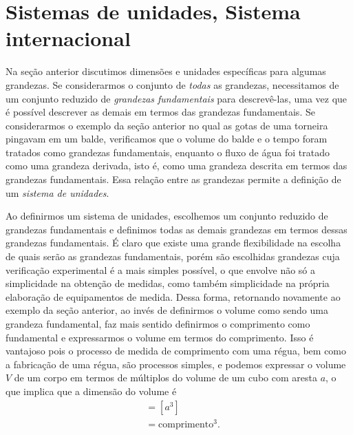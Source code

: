 \section{Sistemas de unidades, Sistema internacional}

Na seção anterior discutimos dimensões e unidades específicas para algumas grandezas. Se considerarmos o conjunto de \emph{todas} as grandezas, necessitamos de um conjunto reduzido de \emph{grandezas fundamentais} para descrevê-las, uma vez que é possível descrever as demais em termos das grandezas fundamentais. Se considerarmos o exemplo da seção anterior no qual as gotas de uma torneira pingavam em um balde, verificamos que o volume do balde e o tempo foram tratados como grandezas fundamentais, enquanto o fluxo de água foi tratado como uma grandeza derivada, isto é, como uma grandeza descrita em termos das grandezas fundamentais. Essa relação entre as grandezas permite a definição de um \emph{sistema de unidades}.

Ao definirmos um sistema de unidades, escolhemos um conjunto reduzido de grandezas fundamentais e definimos todas as demais grandezas em termos dessas grandezas fundamentais. É claro que existe uma grande flexibilidade na escolha de quais serão as grandezas fundamentais, porém são escolhidas grandezas cuja verificação experimental é a mais simples possível, o que envolve não só a simplicidade na obtenção de medidas, como também simplicidade na própria elaboração de equipamentos de medida. Dessa forma, retornando novamente ao exemplo da seção anterior, ao invés de definirmos o volume como sendo uma grandeza fundamental, faz mais sentido definirmos o comprimento como fundamental e expressarmos o volume em termos do comprimento. Isso é vantajoso pois o processo de medida de comprimento com uma régua, bem como a fabricação de uma régua, são processos simples, e podemos expressar o volume $V$ de um corpo em termos de múltiplos do volume de um cubo com aresta $a$, o que implica que a dimensão do volume é
\begin{align}
    [V] &= [a^3] \\
    &= \text{comprimento}^3.
\end{align}


